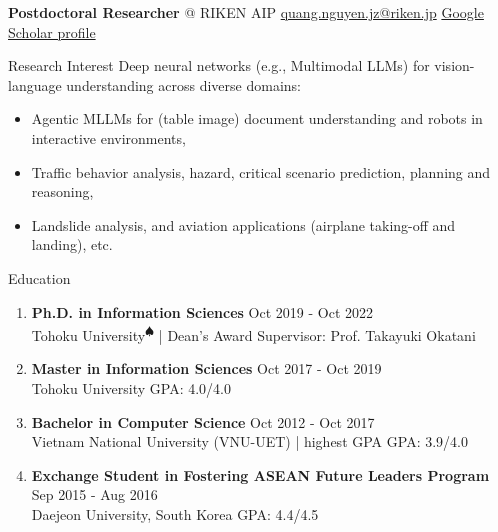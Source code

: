 \documentclass{resume} %
\begin{document}
\begin{center}
{\bf Postdoctoral Researcher} @ RIKEN AIP \textbar \enspace \faEnvelope \enspace \href{quang.nguyen.jz@riken.jp}{quang.nguyen.jz@riken.jp} \textbar \enspace \faGraduationCap \enspace \href{https://scholar.google.com/citations?user=qR180McAAAAJ}{Google Scholar profile}
\end{center}

\begin{rSection}{Research Interest}
Deep neural networks (e.g., Multimodal LLMs) for vision-language understanding across diverse domains:
\begin{itemize}
    \item Agentic MLLMs for (table image) document understanding and robots in interactive environments,
    \item Traffic behavior analysis, hazard, critical scenario prediction, planning and reasoning,
    \item Landslide analysis, and aviation applications (airplane taking-off and landing), etc.
\end{itemize}


\end{rSection}

\begin{rSection}{Education}
	\begin{enumerate}
		\item {\bf Ph.D. in Information Sciences} \hfill {Oct 2019 - Oct 2022} \\ 
		Tohoku University\textsuperscript{$\spadesuit$} | Dean's Award \hfill  Supervisor: Prof. Takayuki Okatani
        
        \item {\bf Master in Information Sciences} \hfill {Oct 2017 - Oct 2019} \\ 
		{Tohoku University} \hfill \hfill GPA: 4.0/4.0
        
        \item {\bf Bachelor in Computer Science} \hfill {Oct 2012 - Oct 2017} \\ 
		{Vietnam National University (VNU-UET) | highest GPA } \hfill \hfill GPA: 3.9/4.0
        	
	\item {\bf Exchange Student in Fostering ASEAN Future Leaders Program} \hfill {Sep 2015 - Aug 2016} \\  
		{Daejeon University, South Korea} \hfill {GPA: 4.4/4.5}
	\end{enumerate}
\end{rSection}
\end{document}

